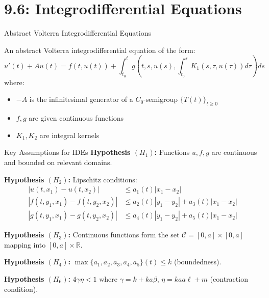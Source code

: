 \documentclass[aspectratio=169,10pt]{beamer}
\begin{document}
\section{9.6: Integrodifferential Equations}

\begin{frame}{Abstract Volterra Integrodifferential Equations}
\begin{definition}
An abstract Volterra integrodifferential equation of the form:
\[
u'(t) + Au(t) = f(t,u(t)) + \int_{t_0}^t g\left(t,s,u(s),\int_{t_0}^s K_1(s,\tau,u(\tau))d\tau\right)ds
\]
where:
\begin{itemize}
    \item $-A$ is the infinitesimal generator of a $C_0$-semigroup $\{T(t)\}_{t \geq 0}$
    \item $f, g$ are given continuous functions
    \item $K_1, K_2$ are integral kernels
\end{itemize}
\end{definition}

\vspace{1em}
\end{frame}

\begin{frame}{Key Assumptions for IDEs}
\textbf{Hypothesis $(H_1)$:} Functions $u, f, g$ are continuous and bounded on relevant domains.

\vspace{0.8em}
\textbf{Hypothesis $(H_2)$:} Lipschitz conditions:
\begin{align}
|u(t,x_1) - u(t,x_2)| &\leq a_1(t)|x_1 - x_2| \\
|f(t,y_1,x_1) - f(t,y_2,x_2)| &\leq a_2(t)|y_1 - y_2| + a_3(t)|x_1 - x_2| \\
|g(t,y_1,x_1) - g(t,y_2,x_2)| &\leq a_4(t)|y_1 - y_2| + a_5(t)|x_1 - x_2|
\end{align}

\vspace{0.8em}
\textbf{Hypothesis $(H_3)$:} Continuous functions form the set $\mathcal{C} = [0,a] \times [0,a]$
mapping into $[0,a] \times \mathbb{R}$.

\vspace{0.8em}
\textbf{Hypothesis $(H_4)$:} $\max\{a_1, a_2, a_3, a_4, a_5\}(t) \leq k$ (boundedness).

\vspace{0.8em}
\textbf{Hypothesis $(H_6)$:} $4\gamma \eta < 1$ where $\gamma = k + ka\beta$,
$\eta = kaa\ell + m$ (contraction condition).
\end{frame}
\end{document}
